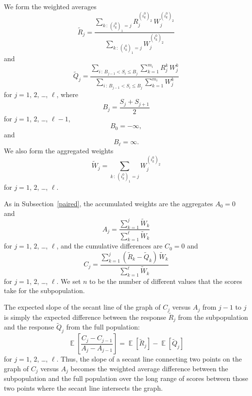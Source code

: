 \documentclass[]{fairmeta}
\DeclareMathOperator{\E}{\mathop{}\mathbb{E}}
\begin{document}
We form the weighted averages
%
\begin{equation}
\tilde{R}_j = \frac{\sum_{k\,:\,(i_k^0)_1 = j}
                    R_j^{(i_k^0)_2} \, W_j^{(i_k^0)_2}}
                   {\sum_{k\,:\,(i_k^0)_1 = j} W_j^{(i_k^0)_2}}
\end{equation}
%
and
%
\begin{equation}
\tilde{Q}_j = \frac{\sum_{i\,:\,B_{j-1} < S_i \le B_j} \sum_{k=1}^{m_i}
                    R_j^k \, W_j^k}
                   {\sum_{i\,:\,B_{j-1} < S_i \le B_j} \sum_{k=1}^{m_i} W_j^k}
\end{equation}
%
for $j = 1$, $2$, \dots, $\ell$,
where
%
\begin{equation}
B_j = \frac{S_j + S_{j+1}}{2}
\end{equation}
%
for $j = 1$, $2$, \dots, $\ell - 1$,
%
\begin{equation}
B_0 = -\infty,
\end{equation}
%
and
%
\begin{equation}
B_{\ell} = \infty.
\end{equation}
%
We also form the aggregated weights
%
\begin{equation}
\tilde{W}_j = \sum_{k\,:\,(i_k^0)_1 = j} W_j^{(i_k^0)_2}
\end{equation}
%
for $j = 1$, $2$, \dots, $\ell$.

As in Subsection~\ref{paired}, the accumulated weights are the aggregates
$A_0 = 0$ and
%
\begin{equation}
A_j = \frac{\sum_{k=1}^j \tilde{W}_k}{\sum_{k=1}^{\ell} \tilde{W}_k}
\end{equation}
%
for $j = 1$, $2$, \dots, $\ell$,
and the cumulative differences are $C_0 = 0$ and
%
\begin{equation}
C_j = \frac{\sum_{k=1}^j (\tilde{R}_k - \tilde{Q}_k) \, \tilde{W}_k}
           {\sum_{k=1}^{\ell} \tilde{W}_k}
\end{equation}
%
for $j = 1$, $2$, \dots, $\ell$.
We set $n$ to be the number of different values that the scores take
for the subpopulation.

The expected slope of the secant line of the graph of $C_j$ versus $A_j$
from $j-1$ to $j$ is simply the expected difference
between the response $\tilde{R}_j$ from the subpopulation and the response
$\tilde{Q}_j$ from the full population:
%
\begin{equation}
\E\left[ \frac{C_j - C_{j-1}}{A_j - A_{j-1}} \right]
= \E[ \tilde{R}_j ] - \E[ \tilde{Q}_j ]
\end{equation}
%
for $j = 1$, $2$, \dots, $\ell$.
Thus, the slope of a secant line connecting two points on the graph
of $C_j$ versus $A_j$ becomes the weighted average difference
between the subpopulation and the full population over the long range
of scores between those two points where the secant line intersects the graph.
\end{document}

